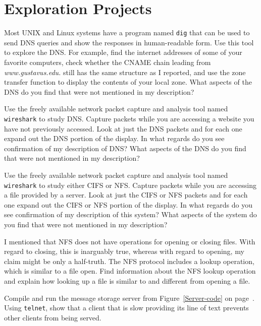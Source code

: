 \section*{Exploration Projects}
\begin{chapterEnumerate}
\item
\label{dns-exploration-dig}
Most UNIX and Linux systems have a program named \verb|dig| that can
be used to send DNS queries and show the responses in human-readable
form.  Use this tool to explore the DNS.  For example, find the
internet addresses of some of your favorite computers, check whether
the CNAME chain leading from \textit{www.gustavus.edu.} still has the
same structure as I reported, and use the zone transfer function to
display the contents of your local zone.  What aspects of the DNS
do you find that were not mentioned in my description?

\item
\label{dns-exploration-ethereal}
Use the freely available network packet capture and analysis tool
named \verb|wireshark| to study DNS.  Capture packets while you are
accessing a website you have not previously accessed.  Look at just
the DNS packets and for each one expand out the DNS portion of the
display.  In what regards do you see confirmation of my description of
DNS?  What aspects of the DNS do you find that were not mentioned in
my description?

\item
Use the freely available network packet capture and analysis tool
named \verb|wireshark| to study either CIFS or NFS.  Capture packets
while you are accessing a file provided by a server.  Look at
just the CIFS or NFS packets and for each one expand out the CIFS or
NFS portion of the display.  In what regards do you see confirmation
of my description of this system?  What aspects of the system do you find that
were not mentioned in my description?

\item
I mentioned that NFS does not have operations for opening or closing
files.  With regard to closing, this is inarguably true, whereas with
regard to opening, my claim might be only a half-truth.  The NFS
protocol includes a lookup operation, which is similar to a file
open.  Find information about the NFS lookup operation and explain
how looking up a file is similar to and different from opening a file.

\item
\label{single-threaded-server-demo}
Compile and run the message storage server from
Figure~\ref{Server-code} on page~\pageref{Server-code}.
Using \verb|telnet|, show that a client that is slow
providing its line of text prevents other clients from being
served.


\end{chapterEnumerate}
